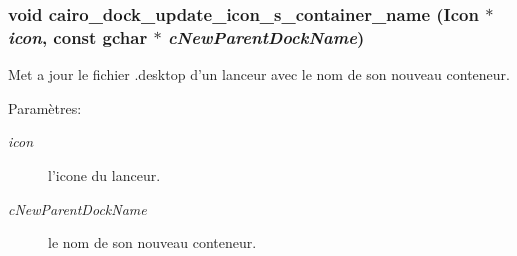 \subsubsection{\setlength{\rightskip}{0pt plus 5cm}void cairo\_\-dock\_\-update\_\-icon\_\-s\_\-container\_\-name ({\bf Icon} $\ast$ {\em icon}, const gchar $\ast$ {\em cNewParentDockName})}\label{cairo-dock-icons_8h_639e91371f54d7919a62da62a1aa974f}


Met a jour le fichier .desktop d'un lanceur avec le nom de son nouveau conteneur. \begin{Desc}
\item[Paramètres:]
\begin{description}
\item[{\em icon}]l'icone du lanceur. \item[{\em cNewParentDockName}]le nom de son nouveau conteneur. \end{description}
\end{Desc}
